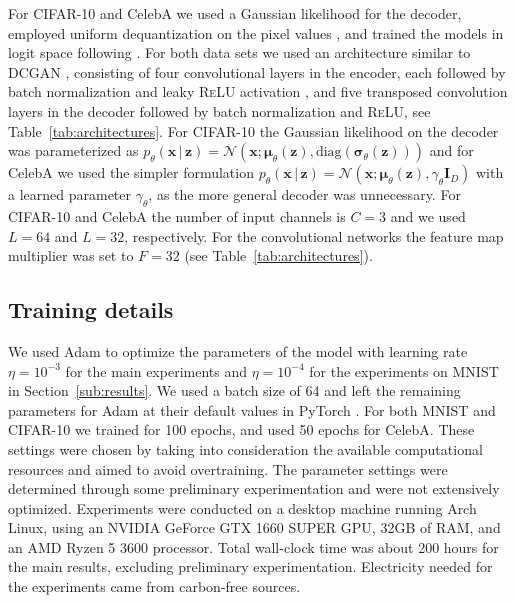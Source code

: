 \documentclass{article}
\newcommand{\bft}[1]{\mathbf{#1}}
\newcommand{\bfs}[1]{\boldsymbol{#1}}
\newcommand{\given}{\,|\,}
\begin{document}
For CIFAR-10 and CelebA we used a Gaussian likelihood for the decoder, 
employed uniform dequantization on the pixel values \cite{uria2013rnade}, and 
trained the models in logit space following \cite{papamakarios2017masked}.  
For both data sets we used an architecture similar to DCGAN 
\cite{radford2016unsupervised}, consisting of four convolutional layers in the 
encoder, each followed by batch normalization \cite{ioffe2015batch} and leaky 
\textsc{ReLU} activation \cite{maas2013rectifier}, and five transposed 
convolution layers in the decoder followed by batch normalization and 
\textsc{ReLU}, see Table~\ref{tab:architectures}. For CIFAR-10 the Gaussian 
likelihood on the decoder was parameterized as $p_{\theta}(\bft{x} \given 
\bft{z}) = \mathcal{N}(\bft{x} ; \bfs{\mu}_{\theta}(\bft{z}), 
\textrm{diag}(\bfs{\sigma}_{\theta}(\bft{z})))$ and for CelebA we used the 
simpler formulation $p_{\theta}(\bft{x} \given \bft{z}) = \mathcal{N}(\bft{x} 
; \bfs{\mu}_{\theta}(\bft{z}), \gamma_{\theta} \bft{I}_D)$ with a learned 
parameter $\gamma_{\theta}$, as the more general decoder was unnecessary. For 
CIFAR-10 and CelebA the number of input channels is $C = 3$ and we used $L = 
64$ and $L = 32$, respectively. For the convolutional networks the feature map 
multiplier was set to $F = 32$ (see Table~\ref{tab:architectures}).

\subsection{Training details}%
\label{sub:training_details}

We used Adam \cite{kingma2015adam} to optimize the parameters of the model 
with learning rate $\eta = 10^{-3}$ for the main experiments and $\eta = 
10^{-4}$ for the experiments on MNIST in Section~\ref{sub:results}. We used a 
batch size of 64 and left the remaining parameters for Adam at their default 
values in PyTorch \cite{paszke2019pytorch}. For both MNIST and CIFAR-10 we 
trained for 100 epochs, and used 50 epochs for CelebA. These settings were 
chosen by taking into consideration the available computational resources and 
aimed to avoid overtraining. The parameter settings were determined through 
some preliminary experimentation and were not extensively optimized.  
Experiments were conducted on a desktop machine running Arch Linux, using an 
NVIDIA GeForce GTX 1660 SUPER GPU, 32GB of RAM, and an AMD Ryzen 5 3600 
processor. Total wall-clock time was about 200 hours for the main results, 
excluding preliminary experimentation. Electricity needed for the experiments 
came from carbon-free sources.
\end{document}
